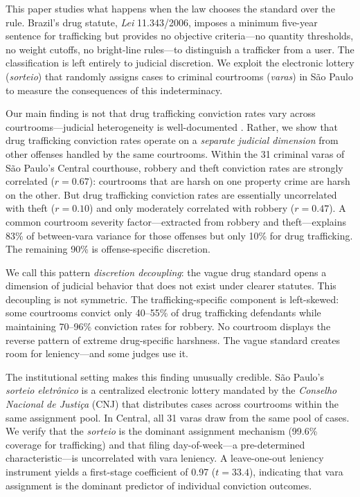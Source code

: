 \documentclass[12pt]{article}
\begin{document}
This paper studies what happens when the law chooses the standard over the rule. Brazil's drug statute, \textit{Lei} 11.343/2006, imposes a minimum five-year sentence for trafficking but provides no objective criteria---no quantity thresholds, no weight cutoffs, no bright-line rules---to distinguish a trafficker from a user. The classification is left entirely to judicial discretion. We exploit the electronic lottery (\textit{sorteio}) that randomly assigns cases to criminal courtrooms (\textit{varas}) in S\~ao Paulo to measure the consequences of this indeterminacy.

Our main finding is not that drug trafficking conviction rates vary across courtrooms---judicial heterogeneity is well-documented \citep{kling2006, dobbie2018}. Rather, we show that drug trafficking conviction rates operate on a \textit{separate judicial dimension} from other offenses handled by the same courtrooms. Within the 31 criminal varas of S\~ao Paulo's Central courthouse, robbery and theft conviction rates are strongly correlated ($r = 0.67$): courtrooms that are harsh on one property crime are harsh on the other. But drug trafficking conviction rates are essentially uncorrelated with theft ($r = 0.10$) and only moderately correlated with robbery ($r = 0.47$). A common courtroom severity factor---extracted from robbery and theft---explains 83\% of between-vara variance for those offenses but only 10\% for drug trafficking. The remaining 90\% is offense-specific discretion.

We call this pattern \textit{discretion decoupling}: the vague drug standard opens a dimension of judicial behavior that does not exist under clearer statutes. This decoupling is not symmetric. The trafficking-specific component is left-skewed: some courtrooms convict only 40--55\% of drug trafficking defendants while maintaining 70--96\% conviction rates for robbery. No courtroom displays the reverse pattern of extreme drug-specific harshness. The vague standard creates room for leniency---and some judges use it.

The institutional setting makes this finding unusually credible. S\~ao Paulo's \textit{sorteio eletr\^onico} is a centralized electronic lottery mandated by the \textit{Conselho Nacional de Justi\c{c}a} (CNJ) that distributes cases across courtrooms within the same assignment pool. In Central, all 31 varas draw from the same pool of cases. We verify that the \textit{sorteio} is the dominant assignment mechanism (99.6\% coverage for trafficking) and that filing day-of-week---a pre-determined characteristic---is uncorrelated with vara leniency. A leave-one-out leniency instrument yields a first-stage coefficient of 0.97 ($t = 33.4$), indicating that vara assignment is the dominant predictor of individual conviction outcomes.
\end{document}
